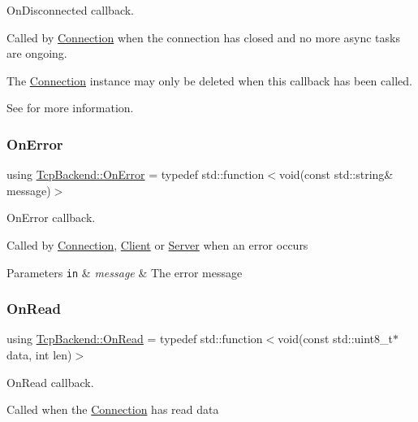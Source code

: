 On\+Disconnected callback. 

Called by \hyperlink{classTcpBackend_1_1Connection}{Connection} when the connection has closed and no more async tasks are ongoing.

The \hyperlink{classTcpBackend_1_1Connection}{Connection} instance may only be deleted when this callback has been called.

See  for more information. \mbox{\label{namespaceTcpBackend_a17e8f044749312a6692cd0135565cbc4}} 
\subsubsection{\texorpdfstring{On\+Error}{OnError}}
{\footnotesize\ttfamily using \hyperlink{namespaceTcpBackend_a17e8f044749312a6692cd0135565cbc4}{Tcp\+Backend\+::\+On\+Error} = typedef std\+::function$<$void(const std\+::string\& message)$>$}



On\+Error callback. 

Called by \hyperlink{classTcpBackend_1_1Connection}{Connection}, \hyperlink{classTcpBackend_1_1Client}{Client} or \hyperlink{classTcpBackend_1_1Server}{Server} when an error occurs


\begin{DoxyParams}[1]{Parameters}
\mbox{\tt in}  & {\em message} & The error message \\
\hline
\end{DoxyParams}
\mbox{\label{namespaceTcpBackend_a7d2c9f63e8017af705255d4ed08264a7}} 
\subsubsection{\texorpdfstring{On\+Read}{OnRead}}
{\footnotesize\ttfamily using \hyperlink{namespaceTcpBackend_a7d2c9f63e8017af705255d4ed08264a7}{Tcp\+Backend\+::\+On\+Read} = typedef std\+::function$<$void(const std\+::uint8\+\_\+t$\ast$ data, int len)$>$}



On\+Read callback. 

Called when the \hyperlink{classTcpBackend_1_1Connection}{Connection} has read data


